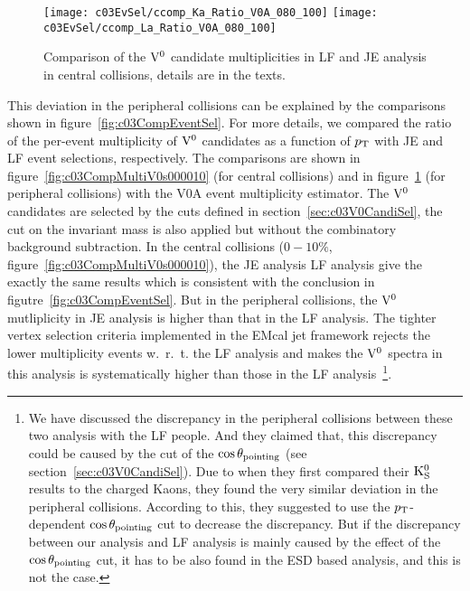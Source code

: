 \begin{figure}[!htb]
\begin{center}
\texttt{[image: c03EvSel/ccomp\_Ka\_Ratio\_V0A\_080\_100]}
\texttt{[image: c03EvSel/ccomp\_La\_Ratio\_V0A\_080\_100]}
\caption{Comparison of the ${\rm V}^{0}$ candidate multiplicities
         in LF and JE analysis in central collisions,
         details are in the texts.}
\label{fig:c03CompMultiV0s080100}
\end{center}
\end{figure}

This deviation in the peripheral collisions can be explained by the
comparisons shown in figure~\ref{fig:c03CompEventSel}.
For more details,
we compared the ratio of the per-event multiplicity of ${\rm V}^{0}$ candidates
as a function of $p_{\rm T}$ with JE and LF event selections, respectively.
The comparisons are shown in figure~\ref{fig:c03CompMultiV0s000010} (for
central collisions) and in figure~\ref{fig:c03CompMultiV0s080100} (for
peripheral collisions) with the V0A event multiplicity estimator.
The ${\rm V}^{0}$ candidates are selected by the cuts defined in
section~\ref{sec:c03V0CandiSel},
the cut on the invariant mass is also applied
but without the combinatory background subtraction.
In the central collisions ($0-10\%$, figure~\ref{fig:c03CompMultiV0s000010}),
the JE analysis LF analysis give the exactly the same results which is
consistent with the conclusion in figutre~\ref{fig:c03CompEventSel}.
But in the peripheral collisions,
the ${\rm V}^{0}$ mutliplicity in JE analysis is higher than that in the LF analysis.
The tighter vertex selection criteria implemented in the EMcal jet framework
rejects the lower multiplicity events w.~r.~t. the LF analysis and makes
the ${\rm V}^{0}$ spectra in this analysis is systematically higher than those in
the LF analysis~\footnote{We have discussed the discrepancy in the peripheral
collisions between these two analysis with the LF people.
And they claimed that, this discrepancy could be caused by the cut of
the $\cos\theta_{\rm pointing}$ (see section~\ref{sec:c03V0CandiSel}).
Due to when they first compared their ${\rm K}_{\rm S}^{0}$ results to the charged Kaons,
they found the very similar deviation in the peripheral collisions.
According to this,
they suggested to use the $p_{\rm T}$-dependent $\cos\theta_{\rm pointing}$ cut
to decrease the discrepancy.
But if the discrepancy between our analysis and LF analysis is mainly caused
by the effect of the $\cos\theta_{\rm pointing}$ cut,
it has to be also found in the ESD based analysis,
and this is not the case.}.


